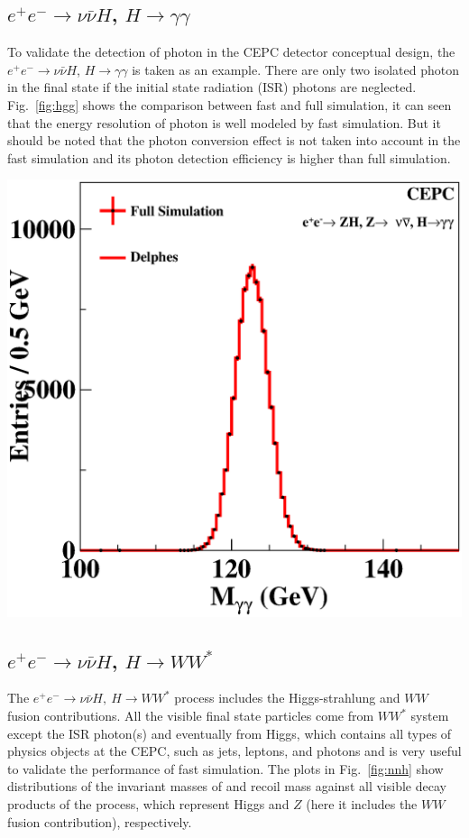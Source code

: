 \documentclass[a4paper,10pt,twoside]{cpc-hepnp}
\begin{document}
\begin{multicols}{2}
\subsection{$e^+e^-\to \nu\bar{\nu}H$, $H \to \gamma \gamma$}
To validate the detection of photon in the CEPC detector conceptual design,
the $e^+e^- \to \nu\bar{\nu}H$, $H\to \gamma \gamma$ is taken as an example.
There are only two isolated photon in the final state if the initial state radiation (ISR) photons are neglected.
Fig.~\ref{fig:hgg} shows the comparison between fast and full simulation,
it can seen that the energy resolution of photon is well modeled by fast simulation.
But it should be noted that the photon conversion effect is not taken into account in the fast simulation
and its photon detection efficiency is higher than full simulation.
\begin{center}
\includegraphics[width=0.9\linewidth]{figs/gg_h}
\end{center}

\subsection{$e^+e^-\to \nu\bar{\nu}H$, $H \to WW^*$}

The $e^+e^- \to \nu\bar{\nu}H,~H\to WW^*$ process includes the Higgs-strahlung and $WW$ fusion  contributions.
All the visible final state particles come from $WW^*$ system except the ISR photon(s) and eventually from Higgs,
which contains all types of physics objects at the CEPC, such as jets, leptons, and photons
and is very useful to validate the performance of fast simulation.
The plots in Fig.~\ref{fig:nnh} show distributions of the invariant masses of and recoil mass against all visible decay products of the process,
which represent Higgs and $Z$ (here it includes the $WW$ fusion contribution), respectively.



\end{multicols}
\end{document}
